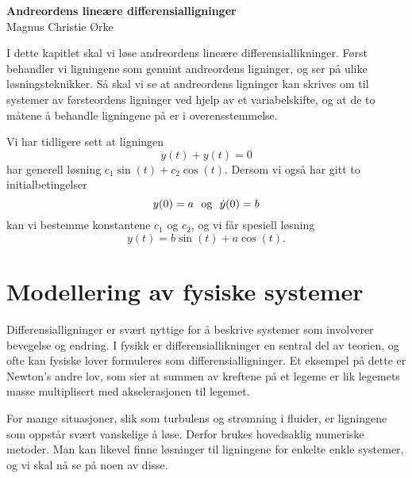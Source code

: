 \documentclass{article}
\theoremstyle{definition}
\newenvironment{ex}
{\pushQED{\qed}\renewcommand{\qedsymbol}{$\triangle$}\exx}
{\popQED\endexx}
\theoremstyle{remark}
\begin{document}
\begin{center}
    \large{\textbf{Andreordens lineære differensialligninger}}
    \\
    \normalsize{Magnus Christie Ørke}
\end{center}
\vspace{\baselineskip}

\begin{multicols*}{2}
I dette kapitlet skal vi løse andreordens lineære differensiallikninger. Først behandler vi ligningene som genuint andreordens ligninger, og ser på ulike løsningsteknikker. Så skal vi se at andreordens ligninger kan skrives om til systemer av førsteordens ligninger ved hjelp av et variabelskifte, og at de to måtene å behandle ligningene på er i overensstemmelse.

\begin{ex}
Vi har tidligere sett at ligningen
\begin{equation*}
    \ddot{y}(t) + y(t) = 0
\end{equation*}
har generell løsning $c_1 \sin(t) + c_2 \cos(t)$. Dersom vi også har gitt to initialbetingelser
\begin{equation*}
  y(0) = a \ \textnormal{ og } \ \dot{y}(0) = b
\end{equation*} kan vi bestemme konstantene $c_1$ og $c_2$, og vi får spesiell løsning
\begin{equation*}
  y(t) = b \sin(t) + a \cos(t).
\end{equation*}
\end{ex}


\section*{Modellering av fysiske systemer}
Differensialligninger er svært nyttige for å beskrive systemer som involverer bevegelse og endring. I fysikk er differensiallikninger en sentral del av teorien, og ofte kan fysiske lover formuleres som differensialligninger. Et eksempel på dette er Newton's andre lov, som sier at summen av kreftene på et legeme er lik legemets masse multiplisert med akselerasjonen til legemet.

For mange situasjoner, slik som turbulens og strømning i fluider, er ligningene som oppstår svært vanskelige å løse. Derfor brukes hovedsaklig numeriske metoder. Man kan likevel finne løsninger til ligningene for enkelte enkle systemer, og vi skal nå se på noen av disse.


\end{multicols*}
\end{document}
